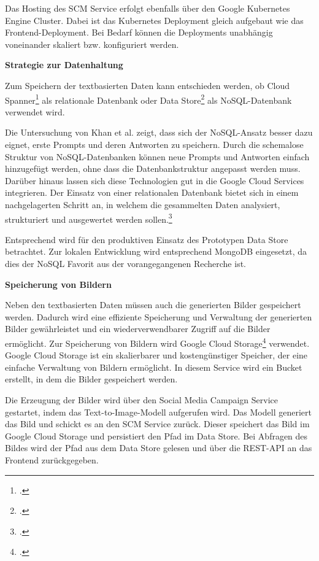 Das Hosting des SCM Service erfolgt ebenfalls über den Google Kubernetes Engine Cluster.
Dabei ist das Kubernetes Deployment gleich aufgebaut wie das Frontend-Deployment.
Bei Bedarf können die Deployments unabhängig voneinander skaliert bzw. konfiguriert werden.

\textbf{Strategie zur Datenhaltung}

Zum Speichern der textbasierten Daten kann entschieden werden, ob Cloud Spanner\footcite{google_spanner} als relationale Datenbank oder Data Store\footcite{google_datastore} als NoSQL-Datenbank verwendet wird.

Die Untersuchung von Khan et al. zeigt, dass sich der NoSQL-Ansatz besser dazu eignet, erste Prompts und deren Antworten zu speichern.
Durch die schemalose Struktur von NoSQL-Datenbanken können neue Prompts und Antworten einfach hinzugefügt werden, ohne dass die Datenbankstruktur angepasst werden muss.
Darüber hinaus lassen sich diese Technologien gut in die Google Cloud Services integrieren.
Der Einsatz von einer relationalen Datenbank bietet sich in einem nachgelagerten Schritt an, in welchem die gesammelten Daten analysiert, strukturiert und ausgewertet werden sollen.\footcite{Khan2022SQL}

Entsprechend wird für den produktiven Einsatz des Prototypen Data Store betrachtet.
Zur lokalen Entwicklung wird entsprechend MongoDB eingesetzt, da dies der NoSQL Favorit aus der vorangegangenen Recherche ist.

\textbf{Speicherung von Bildern}

Neben den textbasierten Daten müssen auch die generierten Bilder gespeichert werden.
Dadurch wird eine effiziente Speicherung und Verwaltung der generierten Bilder gewährleistet und ein wiederverwendbarer Zugriff auf die Bilder ermöglicht.
Zur Speicherung von Bildern wird Google Cloud Storage\footcite{google_storage} verwendet.
Google Cloud Storage ist ein skalierbarer und kostengünstiger Speicher, der eine einfache Verwaltung von Bildern ermöglicht.
In diesem Service wird ein Bucket erstellt, in dem die Bilder gespeichert werden.

Die Erzeugung der Bilder wird über den Social Media Campaign Service gestartet, indem das Text-to-Image-Modell aufgerufen wird.
Das Modell generiert das Bild und schickt es an den SCM Service zurück.
Dieser speichert das Bild im Google Cloud Storage und persistiert den Pfad im Data Store.
Bei Abfragen des Bildes wird der Pfad aus dem Data Store gelesen und über die REST-API an das Frontend zurückgegeben.


